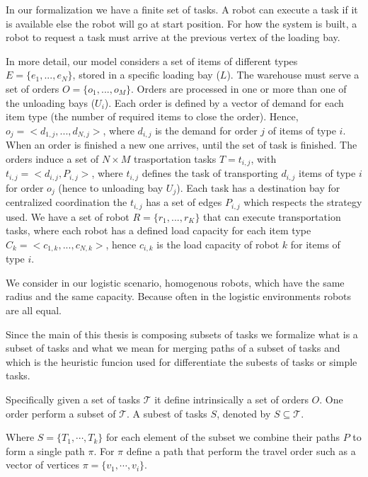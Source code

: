 In our formalization we have a finite set of tasks. A robot can execute a task if it is available else the robot will go at start position.
For how the system is built, a robot to request a task must arrive at the previous vertex of the loading bay.

In more detail, our model considers a set of items of different types $E = \{ e_1,...,e_N\}$,
stored in a specific loading bay ($L$). The warehouse must serve a set of orders 
$O=\{o_1,...,o_M\}$. Orders are processed in one or more than one of the unloading bays ($U_i$).
Each order is defined by a vector of demand for each item type (the number of required 
items to close the order). Hence, $o_j = < d_{1,j},...,d_{N,j}>$, where $d_{i,j}$ is the 
demand for order $j$ of items of type $i$. When an order is finished a new one arrives,
until the set of task is finished.
The orders induce a set of $N \times M$ trasportation tasks $T = {t_{i,j}}$, with 
$t_{i,j} = < d_{i,j}, P_{i,j}>$, where $t_{i,j}$ defines the task of transporting 
$d_{i,j}$ items of type $i$ for order $o_j$ (hence to unloading bay $U_j$).
Each task has a destination bay for centralized coordination the $t_{i,j}$ has a set of edges
$P_{i,j}$ which respects the strategy used. 
We have a set of robot $R = \{r_1,...,r_K \}$ that can execute transportation tasks, where
each robot has a defined load capacity for each item type $C_k = <c_{1,k},...,c_{N,k}>$, 
hence $c_{i,k}$ is the load capacity of robot $k$ for items of type $i$.

We consider in our logistic scenario, homogenous robots, which have the same radius 
and the same capacity. Because often in the logistic environments robots are all 
equal. 

Since the main of this thesis is composing subsets of tasks we formalize what is 
a subset of tasks and what we mean for merging paths of a subset of tasks and 
which is the heuristic funcion used for differentiate the subests of tasks or simple tasks.

Specifically given a set of tasks $\mathcal{T}$ it define intrinsically a set of orders $O$.
One order perform a subset of $\mathcal{T}$. A subest of tasks $S$, denoted by $S\subseteq\mathcal{T}$.

Where $S = \{T_1,\cdots,T_k\}$ for each element of the subset we combine their paths $P$ to form a single path $\pi$.
For $\pi$ define a path that perform the travel order such as a vector of vertices $\pi = \{v_1,\cdots,v_i\}$.

